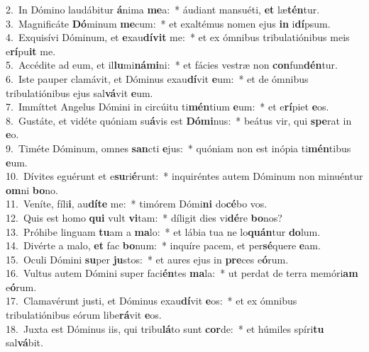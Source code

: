 {2.~}In Dómino laudábitur \textbf{á}nima \textbf{me}a:~* áudiant mansuéti, \textbf{et} læ\textbf{tén}tur.\\
{3.~}Magnificáte \textbf{Dó}minum \textbf{me}cum:~* et exaltémus nomen ejus \textbf{in} i\textbf{dí}psum.\\
{4.~}Exquisívi Dóminum, et \textbf{e}xau\textbf{dí}\textbf{vit} me:~* et ex ómnibus tribulatiónibus meis e\textbf{rí}pu\textbf{it} me.\\
{5.~}Accédite ad eum, et il\textbf{lu}mi\textbf{ná}\textbf{mi}ni:~* et fácies vestræ non \textbf{con}fun\textbf{dén}tur.\\
{6.~}Iste pauper clamávit, et Dóminus exau\textbf{dí}vit \textbf{e}um:~* et de ómnibus tribulatiónibus ejus sal\textbf{vá}vit \textbf{e}um.\\
{7.~}Immíttet Angelus Dómini in circúitu ti\textbf{mén}tium \textbf{e}um:~* et e\textbf{rí}piet \textbf{e}os.\\
{8.~}Gustáte, et vidéte quóniam su\textbf{á}vis est \textbf{Dó}\textbf{mi}nus:~* beátus vir, qui \textbf{spe}rat in \textbf{e}o.\\
{9.~}Timéte Dóminum, omnes \textbf{san}cti \textbf{e}jus:~* quóniam non est inópia ti\textbf{mén}tibus \textbf{e}um.\\
{10.~}Dívites eguérunt et e\textbf{su}ri\textbf{é}runt:~* inquiréntes autem Dóminum non minuéntur \textbf{om}ni \textbf{bo}no.\\
{11.~}Veníte, fíli\textbf{i}, au\textbf{dí}\textbf{te} me:~* timórem Dómi\textbf{ni} do\textbf{cé}bo vos.\\
{12.~}Quis est homo \textbf{qui} vult \textbf{vi}tam:~* díligit dies vi\textbf{dé}re \textbf{bo}nos?\\
{13.~}Próhibe linguam \textbf{tu}am a \textbf{ma}lo:~* et lábia tua ne lo\textbf{quán}tur \textbf{do}lum.\\
{14.~}Divérte a malo, \textbf{et} fac \textbf{bo}num:~* inquíre pacem, et per\textbf{sé}quere \textbf{e}am.\\
{15.~}Oculi Dómini \textbf{su}per \textbf{ju}stos:~* et aures ejus in \textbf{pre}ces e\textbf{ó}rum.\\
{16.~}Vultus autem Dómini super faci\textbf{én}tes \textbf{ma}la:~* ut perdat de terra memóri\textbf{am} e\textbf{ó}rum.\\
{17.~}Clamavérunt justi, et Dóminus exau\textbf{dí}vit \textbf{e}os:~* et ex ómnibus tribulatiónibus eórum libe\textbf{rá}vit \textbf{e}os.\\
{18.~}Juxta est Dóminus iis, qui tribu\textbf{lá}to sunt \textbf{cor}de:~* et húmiles spíri\textbf{tu} sal\textbf{vá}bit.\\

